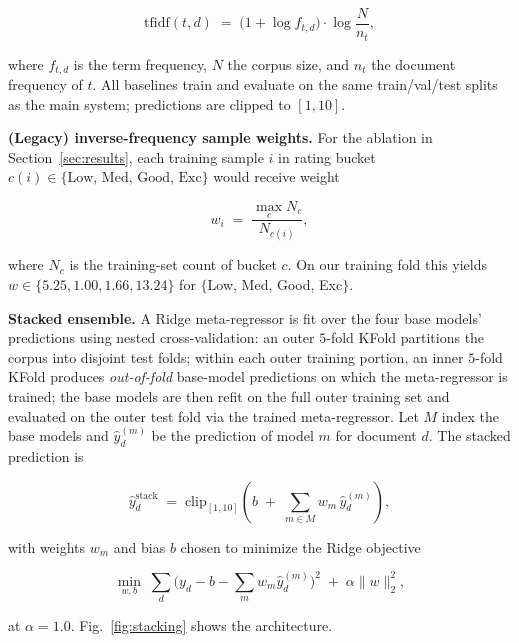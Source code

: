 \documentclass[runningheads]{llncs}
\begin{document}
\begin{equation}
\mathrm{tfidf}(t, d) \;=\; \big(1 + \log f_{t,d}\big)\cdot \log\!\frac{N}{n_{t}},
\label{eq:tfidf}
\end{equation}

where $f_{t,d}$ is the term frequency, $N$ the corpus size, and
$n_{t}$ the document frequency of $t$. All baselines train and
evaluate on the same train/val/test splits as the main system;
predictions are clipped to $[1, 10]$.

\noindent\textbf{(Legacy) inverse-frequency sample weights.}
For the ablation in Section~\ref{sec:results}, each training
sample $i$ in rating bucket $c(i) \in \{\text{Low, Med, Good,
Exc}\}$ would receive weight

\begin{equation}
w_{i} \;=\; \frac{\max_{c} N_{c}}{N_{c(i)}},
\label{eq:weights}
\end{equation}

where $N_{c}$ is the training-set count of bucket $c$. On our
training fold this yields $w \in \{5.25, 1.00, 1.66, 13.24\}$ for
$\{$Low, Med, Good, Exc$\}$.

\noindent\textbf{Stacked ensemble.}
A Ridge meta-regressor is fit over the four base models'
predictions using nested cross-validation: an outer $5$-fold KFold
partitions the corpus into disjoint test folds; within each outer
training portion, an inner $5$-fold KFold produces
\emph{out-of-fold} base-model predictions on which the
meta-regressor is trained; the base models are then refit on the
full outer training set and evaluated on the outer test fold via
the trained meta-regressor. Let $M$ index the base models and
$\hat{y}_{d}^{(m)}$ be the prediction of model $m$ for document
$d$. The stacked prediction is

\begin{equation}
\hat{y}_{d}^{\text{stack}}
\;=\; \mathrm{clip}_{[1,10]}\!\left( b \;+\; \sum_{m \in M} w_{m}\, \hat{y}_{d}^{(m)} \right),
\label{eq:stack}
\end{equation}

with weights $w_{m}$ and bias $b$ chosen to minimize the Ridge
objective

\begin{equation}
\min_{w, b}\;
\sum_{d}\Big(y_{d} - b - \sum_{m} w_{m}\hat{y}_{d}^{(m)}\Big)^{2}
\;+\; \alpha \|w\|_{2}^{2},
\label{eq:ridge}
\end{equation}

at $\alpha = 1.0$. Fig.~\ref{fig:stacking} shows the architecture.
\end{document}
